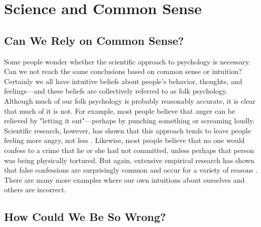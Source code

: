 \newpage
\section{Science and Common Sense}


\subsection{Can We Rely on Common Sense?}
Some people wonder whether the scientific approach to psychology is necessary. Can we not reach the same conclusions based on common sense or intuition? Certainly we all have intuitive beliefs about people's behavior, thoughts, and feelings---and these beliefs are collectively referred to as folk psychology. Although much of our folk psychology is probably reasonably accurate, it is clear that much of it is not. For example, most people believe that anger can be relieved by "letting it out"---perhaps by punching something or screaming loudly. Scientific research, however, has shown that this approach tends to leave people feeling more angry, not less \citep{bushman_does_2002}. Likewise, most people believe that no one would confess to a crime that he or she had not committed, unless perhaps that person was being physically tortured. But again, extensive empirical research has shown that false confessions are surprisingly common and occur for a variety of reasons \citep{kassin_psychology_2004}. There are many more examples where our own intuitions about ourselves and others are incorrect.

\subsection{How Could We Be So Wrong?}

